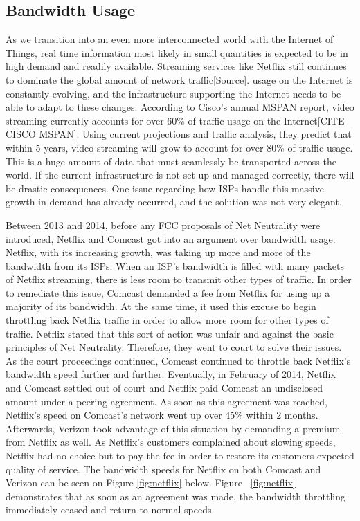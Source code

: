\documentclass{sigcomm-alternate}
\begin{document}
\subsection{Bandwidth Usage}
As we transition into an even more interconnected world with the Internet of Things, real time information most likely in small quantities is expected to be in high demand and readily available. Streaming services like Netflix still continues to dominate the global amount of network traffic[Source]. usage on the Internet is constantly evolving, and the infrastructure supporting the Internet needs to be able to adapt to these changes. According to Cisco’s annual MSPAN report, video streaming currently accounts for over 60\% of traffic usage on the Internet[CITE CISCO MSPAN]. Using current projections and traffic analysis, they predict that within 5 years, video streaming will grow to account for over 80\% of traffic usage. This is a huge amount of data that must seamlessly be transported across the world. If the current infrastructure is not set up and managed correctly, there will be drastic consequences. One issue regarding how ISPs handle this massive growth in demand has already occurred, and the solution was not very elegant.

Between 2013 and 2014, before any FCC proposals of Net Neutrality were introduced, Netflix and Comcast got into an argument over bandwidth usage. Netflix, with its increasing growth, was taking up more and more of the bandwidth from its ISPs. When an ISP’s bandwidth is filled with many packets of Netflix streaming, there is less room to transmit other types of traffic. In order to remediate this issue, Comcast demanded a fee from Netflix for using up a majority of its bandwidth. At the same time, it used this excuse to begin throttling back Netflix traffic in order to allow more room for other types of traffic. Netflix stated that this sort of action was unfair and against the basic principles of Net Neutrality. Therefore, they went to court to solve their issues. As the court proceedings continued, Comcast continued to throttle back Netflix’s bandwidth speed further and further. Eventually, in February of 2014, Netflix and Comcast settled out of court and Netflix paid Comcast an undisclosed amount under a peering agreement. As soon as this agreement was reached, Netflix’s speed on Comcast’s network went up over 45\% within 2 months. Afterwards, Verizon took advantage of this situation by demanding a premium from Netflix as well. As Netflix’s customers complained about slowing speeds, Netflix had no choice but to pay the fee in order to restore its customers expected quality of service. The bandwidth speeds for Netflix on both Comcast and Verizon can be seen on Figure \ref{fig:netflix} below. Figure ~\ref{fig:netflix} demonstrates that as soon as an agreement was made, the bandwidth throttling immediately ceased and return to normal speeds.
\end{document}
